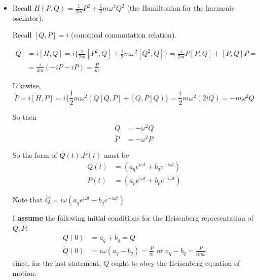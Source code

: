 \documentclass[twoside]{amsart}
\newcommand{\solutionhead}[1]
  {\smallskip
   \noindent{\large\bf Solution #1.}
   }
\begin{document}
\solutionhead{7.3} \begin{itemize}
\item[(a)] Recall $H(P,Q) = \frac{1}{2m} P^2 + \frac{1}{2} m\omega^2 Q^2$ (the Hamiltonian for the harmonic oscilator).  

Recall $[Q,P] = i$ (canonical commutation relation).  

\[
\begin{aligned}
  \dot{Q} & = i [H,Q] = i \lbrace \frac{1}{2m} [P^2, Q] + \frac{1}{2} m \omega^2 [Q^2,Q] \rbrace = \frac{i}{2m} P[P,Q] + [P,Q]P = \\ 
  & = \frac{i}{2m} (-i P - i P) = \frac{P}{m} 
\end{aligned}
\]

Likewise, 
\[
\dot{P} = i[H,P] = i \lbrace \frac{1}{2} m \omega^2 ( Q[Q,P] + [Q,P] Q) \rbrace = \frac{i}{2} m \omega^2 (2i Q) = - m \omega^2 Q
\]

So then 
\[
\begin{aligned}
\ddot{Q} & = - \omega^2 Q \\ 
\ddot{P} & = - \omega^2 P 
\end{aligned}
\]

So the form of $Q(t). P(t)$ must be
\[
\begin{aligned}
  Q(t) & = (a_q e^{i\omega t} + b_q e^{-i\omega t} ) \\ 
  P(t) & = (a_p e^{i\omega t} + b_p e^{-i\omega t} ) 
\end{aligned}
\]

Note that $\dot{Q} = i\omega (a_q e^{i\omega t} - b_q e^{-i\omega t})$

I \textbf{assume} the following initial conditions for the Heisenberg representation of $Q,P$:
\[
\begin{aligned}
  Q(0) & = a_q + b_q = Q \\ 
  \dot{Q}(0) & = i \omega (a_q - b_q) = \frac{P}{m} \text{ or } a_q - b_q = \frac{P}{im \omega}
\end{aligned}
\]
since, for the last statement, $Q$ ought to obey the Heisenberg equation of motion.  


\end{itemize}
\end{document}
